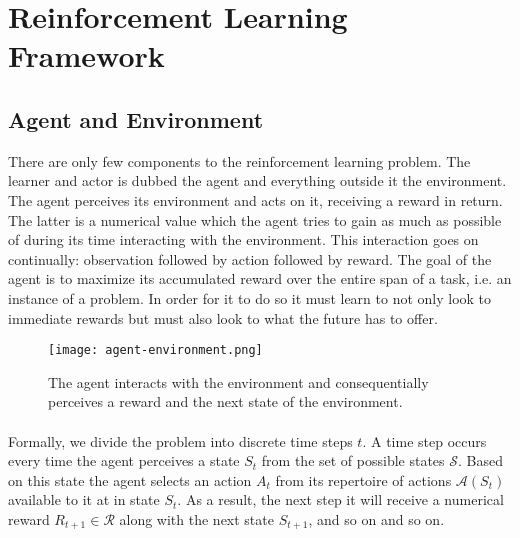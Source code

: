 



\section{Reinforcement Learning Framework}
\subsection{Agent and Environment}
There are only few components to the reinforcement learning problem.
The learner and actor is dubbed the agent and everything outside it the environment.
The agent perceives its environment and acts on it,
receiving a reward in return.
The latter is a numerical value
which the agent tries to gain as much as possible of
during its time interacting with the environment.
This interaction goes on continually:
observation followed by action followed by reward.
The goal of the agent is to maximize its accumulated reward
over the entire span of a task,
i.e. an instance of a problem.
In order for it to do so
it must learn to not only look to immediate rewards
but must also look to what the future has to offer.

\begin{figure}[ht]
	\center
	\texttt{[image: agent-environment.png]}
  \caption[Reinforcement learning framework]{
    The agent interacts with the environment and
    consequentially perceives a reward and the next state of the environment.
  \parencite{sutton1998book}
  }
	\label{agent-env}
\end{figure}

\paragraph{}
Formally, we divide the problem into discrete time steps $t$.
A time step occurs every time the agent perceives a state $S_t$
from the set of possible states $\mathcal{S}$.
Based on this state the agent selects an action $A_t$
from its repertoire of actions $\mathcal{A}(S_t)$
available to it at in state $S_t$.
As a result, the next step it will receive
a numerical reward $R_{t+1} \in \mathcal{R}$
along with the next state $S_{t+1}$,
and so on and so on.

